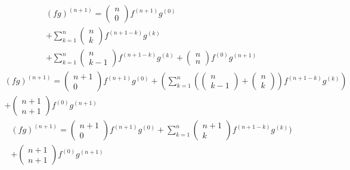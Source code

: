 \documentclass[12pt]{article}
\begin{document}
    \begin{equation} \label{eq: 6.5}
        \begin{split}
        {(fg)}^{(n+1)} = \begin{pmatrix} n\\ 0 \end{pmatrix} f^{(n+1)} g^{(0)} 
        \\+ \sum_{k=1}^{n} \begin{pmatrix} n\\ k \end{pmatrix} f^{(n+1-k)} g^{(k)} 
        \\+ \sum_{k=1}^{n} \begin{pmatrix} n\\ k-1 \end{pmatrix} f^{(n+1-k)} g^{(k)} + \begin{pmatrix} n\\ n \end{pmatrix} f^{(0)} g^{(n+1)}
        \end{split}
    \end{equation}
    \begin{equation} \label{eq: 6.6}
        \begin{split}
        {(fg)}^{(n+1)} = \begin{pmatrix} n+1\\ 0 \end{pmatrix} f^{(n+1)} g^{(0)} + \left(\sum_{k=1}^{n} \left(\begin{pmatrix} n\\ k-1 \end{pmatrix} + \begin{pmatrix} n\\ k \end{pmatrix}\right) f^{(n+1-k)} g^{(k)}\right) 
        \\+ \begin{pmatrix} n+1\\ n+1 \end{pmatrix} f^{(0)} g^{(n+1)}
        \end{split}
    \end{equation}
    \begin{equation} \label{eq: 6.7}
        \begin{split}
        {(fg)}^{(n+1)} = \begin{pmatrix} n+1\\ 0 \end{pmatrix} f^{(n+1)} g^{(0)} + \sum_{k=1}^{n} \begin{pmatrix} n+1\\ k \end{pmatrix} f^{(n+1-k)} g^{(k)}) 
        \\ + \begin{pmatrix} n+1\\ n+1 \end{pmatrix} f^{(0)} g^{(n+1)}
        \end{split}
    \end{equation}
\end{document}
